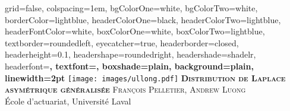 \documentclass[portrait,final,a0paper,fontscale=0.277]{baposter}
\begin{document}

\begin{poster}%
  {
  grid=false,
  colspacing=1em,
  bgColorOne=white,
  bgColorTwo=white,
  borderColor=lightblue,
  headerColorOne=black,
  headerColorTwo=lightblue,
  headerFontColor=white,
  boxColorOne=white,
  boxColorTwo=lightblue,
  textborder=roundedleft,
  eyecatcher=true,
  headerborder=closed,
  headerheight=0.1\textheight,
  headershape=roundedright,
  headershade=shadelr,
  headerfont=\Large\bf\textsc, %
  textfont={\setlength{\parindent}{1.5em}},
  boxshade=plain,
  background=plain,
  linewidth=2pt
  }
  {\texttt{[image: images/ullong.pdf]}} 
  {\bf\textsc{Distribution de Laplace asymétrique généralisée}\vspace{0.5em}}
  {\textsc{François Pelletier, Andrew Luong} \\ \small{École d'actuariat, Université Laval}}
  {%
    
  }

    \newcommand{\colouredcircle}{%
      \tikz{\useasboundingbox (-0.2em,-0.32em) rectangle(0.2em,0.32em); \draw[draw=black,fill=lightblue,line width=0.03em] (0,0) circle(0.18em);}}


\end{poster}
\end{document}
